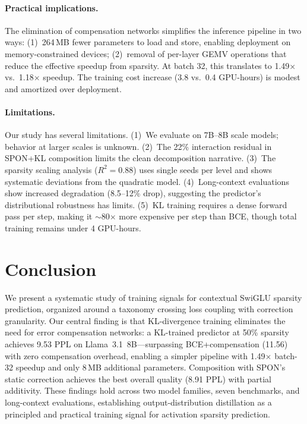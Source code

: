 \documentclass[11pt]{article}
\begin{document}
\paragraph{Practical implications.}
The elimination of compensation networks simplifies the inference pipeline in two ways: (1)~264\,MB fewer parameters to load and store, enabling deployment on memory-constrained devices; (2)~removal of per-layer GEMV operations that reduce the effective speedup from sparsity. At batch 32, this translates to 1.49$\times$ vs.\ 1.18$\times$ speedup. The training cost increase (3.8 vs.\ 0.4 GPU-hours) is modest and amortized over deployment.

\paragraph{Limitations.}
Our study has several limitations. (1)~We evaluate on 7B--8B scale models; behavior at larger scales is unknown. (2)~The 22\% interaction residual in SPON+KL composition limits the clean decomposition narrative. (3)~The sparsity scaling analysis ($R^2 = 0.88$) uses single seeds per level and shows systematic deviations from the quadratic model. (4)~Long-context evaluations show increased degradation (8.5--12\% drop), suggesting the predictor's distributional robustness has limits. (5)~KL training requires a dense forward pass per step, making it ${\sim}$80$\times$ more expensive per step than BCE, though total training remains under 4 GPU-hours.


\section{Conclusion}

We present a systematic study of training signals for contextual SwiGLU sparsity prediction, organized around a taxonomy crossing loss coupling with correction granularity. Our central finding is that KL-divergence training eliminates the need for error compensation networks: a KL-trained predictor at 50\% sparsity achieves 9.53 PPL on Llama~3.1~8B---surpassing BCE+compensation (11.56) with zero compensation overhead, enabling a simpler pipeline with 1.49$\times$ batch-32 speedup and only 8\,MB additional parameters. Composition with SPON's static correction achieves the best overall quality (8.91 PPL) with partial additivity. These findings hold across two model families, seven benchmarks, and long-context evaluations, establishing output-distribution distillation as a principled and practical training signal for activation sparsity prediction.
\end{document}

